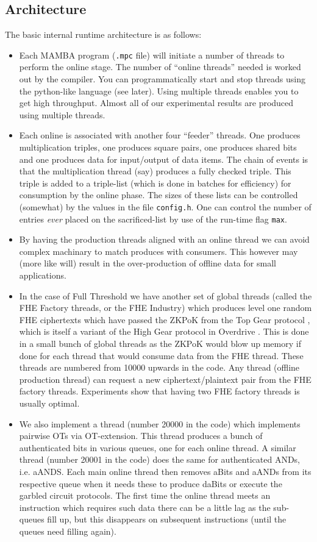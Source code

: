 \subsection{Architecture}
The basic internal runtime architecture is as follows:
\begin{itemize}
\item Each MAMBA program (\verb+.mpc+ file) will initiate a number of threads
to perform the online stage.
The number of ``online threads'' needed is worked out by the compiler. You
can programmatically start and stop threads using the python-like
language (see later).
Using multiple threads enables you to get high throughput. Almost all
of our experimental results are produced using multiple threads.
\item Each online is associated with another four ``feeder'' threads.
One produces multiplication triples, one produces square pairs,
one produces shared bits and one produces data for input/output
of data items.
The chain of events is that the multiplication thread (say) produces
a fully checked triple. This triple is added to a triple-list (which is
done in batches for efficiency) for consumption by the online
phase.
The sizes of these lists can be controlled (somewhat) by the
values in the file \verb+config.h+.
One can control the number of entries {\em ever}
placed on the sacrificed-list by use of the run-time flag \verb+max+.
\item By having the production threads aligned with an online
thread we can avoid complex machinary to match produces with
consumers. This however may (more like will) result in the 
over-production of offline data for small applications.
\item In the case of Full Threshold we have another set of global
threads (called the FHE Factory threads, or the FHE Industry) 
which produces level one random FHE ciphertexts which have passed 
the ZKPoK from the Top Gear protocol \cite{TopGear},
which is itself a variant of the High Gear protocol in Overdrive \cite{KPR}.
This is done in a small bunch of global threads as the ZKPoK would
blow up memory if done for each thread that would consume 
data from the FHE thread.
These threads are numbered from 10000 upwards in the code.
Any thread (offline production thread) can request a new
ciphertext/plaintext pair from the FHE factory threads.
Experiments show that having two FHE factory threads is usually
optimal.
\item We also implement a thread (number 20000 in the code)
which implements pairwise OTs via OT-extension.
This thread produces a bunch of authenticated bits in various
queues, one for each online thread.
A similar thread (number 20001 in the code) does the
same for authenticated ANDs, i.e. aANDS.
Each main online thread then removes aBits and aANDs 
from its respective queue when it needs these to produce  
daBits or execute the garbled circuit protocols.
The first time the online thread meets an instruction which
requires such data there can be a little lag as the sub-queues
fill up, but this disappears on subsequent instructions
(until the queues need filling again).
\end{itemize}


